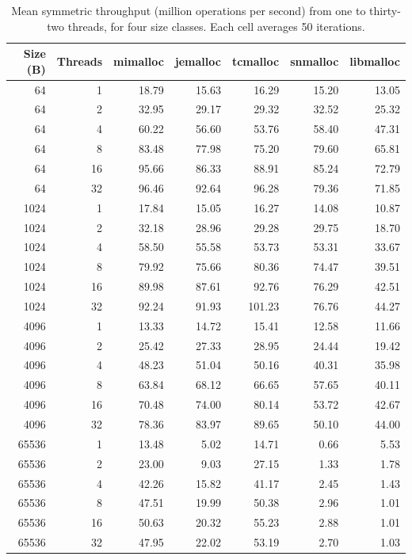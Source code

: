 \begin{table}[!htbp]
\centering
\footnotesize
\setlength{\tabcolsep}{3pt}
\caption{Mean symmetric throughput (million operations per second) from one to thirty-two threads, for four size classes. Each cell averages 50 iterations.}
\label{tab:scaling-throughput}
\begin{tabular}{rrrrrrr}
\toprule
Size (B) & Threads & mimalloc & jemalloc & tcmalloc & snmalloc & libmalloc \\
\midrule
64 & 1 & 18.79 & 15.63 & 16.29 & 15.20 & 13.05 \\
64 & 2 & 32.95 & 29.17 & 29.32 & 32.52 & 25.32 \\
64 & 4 & 60.22 & 56.60 & 53.76 & 58.40 & 47.31 \\
64 & 8 & 83.48 & 77.98 & 75.20 & 79.60 & 65.81 \\
64 & 16 & 95.66 & 86.33 & 88.91 & 85.24 & 72.79 \\
64 & 32 & 96.46 & 92.64 & 96.28 & 79.36 & 71.85 \\
1024 & 1 & 17.84 & 15.05 & 16.27 & 14.08 & 10.87 \\
1024 & 2 & 32.18 & 28.96 & 29.28 & 29.75 & 18.70 \\
1024 & 4 & 58.50 & 55.58 & 53.73 & 53.31 & 33.67 \\
1024 & 8 & 79.92 & 75.66 & 80.36 & 74.47 & 39.51 \\
1024 & 16 & 89.98 & 87.61 & 92.76 & 76.29 & 42.51 \\
1024 & 32 & 92.24 & 91.93 & 101.23 & 76.76 & 44.27 \\
4096 & 1 & 13.33 & 14.72 & 15.41 & 12.58 & 11.66 \\
4096 & 2 & 25.42 & 27.33 & 28.95 & 24.44 & 19.42 \\
4096 & 4 & 48.23 & 51.04 & 50.16 & 40.31 & 35.98 \\
4096 & 8 & 63.84 & 68.12 & 66.65 & 57.65 & 40.11 \\
4096 & 16 & 70.48 & 74.00 & 80.14 & 53.72 & 42.67 \\
4096 & 32 & 78.36 & 83.97 & 89.65 & 50.10 & 44.00 \\
65536 & 1 & 13.48 & 5.02 & 14.71 & 0.66 & 5.53 \\
65536 & 2 & 23.00 & 9.03 & 27.15 & 1.33 & 1.78 \\
65536 & 4 & 42.26 & 15.82 & 41.17 & 2.45 & 1.43 \\
65536 & 8 & 47.51 & 19.99 & 50.38 & 2.96 & 1.01 \\
65536 & 16 & 50.63 & 20.32 & 55.23 & 2.88 & 1.01 \\
65536 & 32 & 47.95 & 22.02 & 53.19 & 2.70 & 1.03 \\
\bottomrule
\end{tabular}
\end{table}
